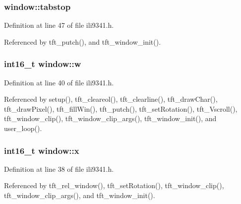 \subsubsection[{\texorpdfstring{tabstop}{tabstop}}]{ window\+::tabstop}\hypertarget{structwindow_a88d2836d45dd428d8fadfd703f0f965f}{}\label{structwindow_a88d2836d45dd428d8fadfd703f0f965f}


Definition at line 47 of file ili9341.\+h.



Referenced by tft\+\_\+putch(), and tft\+\_\+window\+\_\+init().

\subsubsection[{\texorpdfstring{w}{w}}]{\setlength{\rightskip}{0pt plus 5cm}int16\+\_\+t window\+::w}\hypertarget{structwindow_ad89fdeb11ce94e2e7501f7290372d6ae}{}\label{structwindow_ad89fdeb11ce94e2e7501f7290372d6ae}


Definition at line 40 of file ili9341.\+h.



Referenced by setup(), tft\+\_\+cleareol(), tft\+\_\+clearline(), tft\+\_\+draw\+Char(), tft\+\_\+draw\+Pixel(), tft\+\_\+fill\+Win(), tft\+\_\+putch(), tft\+\_\+set\+Rotation(), tft\+\_\+\+Vscroll(), tft\+\_\+window\+\_\+clip(), tft\+\_\+window\+\_\+clip\+\_\+args(), tft\+\_\+window\+\_\+init(), and user\+\_\+loop().

\subsubsection[{\texorpdfstring{x}{x}}]{\setlength{\rightskip}{0pt plus 5cm}int16\+\_\+t window\+::x}\hypertarget{structwindow_a879b99940dfc34772f0257f54c67b817}{}\label{structwindow_a879b99940dfc34772f0257f54c67b817}


Definition at line 38 of file ili9341.\+h.



Referenced by tft\+\_\+rel\+\_\+window(), tft\+\_\+set\+Rotation(), tft\+\_\+window\+\_\+clip(), tft\+\_\+window\+\_\+clip\+\_\+args(), and tft\+\_\+window\+\_\+init().

